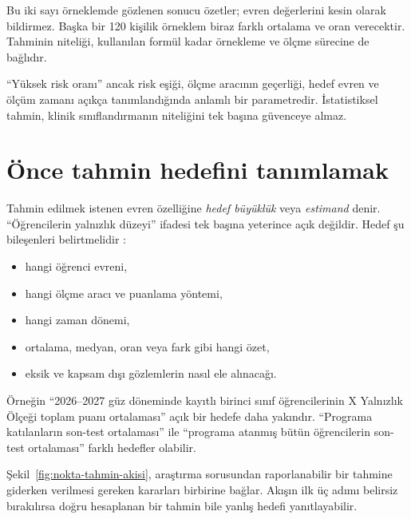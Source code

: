 Bu iki sayı örneklemde gözlenen sonucu özetler; evren değerlerini kesin olarak
bildirmez. Başka bir 120 kişilik örneklem biraz farklı ortalama ve oran
verecektir. Tahminin niteliği, kullanılan formül kadar örnekleme ve ölçme
sürecine de bağlıdır.

\begin{researchbox}
``Yüksek risk oranı'' ancak risk eşiği, ölçme aracının geçerliği, hedef evren
ve ölçüm zamanı açıkça tanımlandığında anlamlı bir parametredir. İstatistiksel
tahmin, klinik sınıflandırmanın niteliğini tek başına güvenceye almaz.
\end{researchbox}

\section{Önce tahmin hedefini tanımlamak}

Tahmin edilmek istenen evren özelliğine \emph{hedef büyüklük} veya
\emph{estimand} denir. ``Öğrencilerin yalnızlık düzeyi'' ifadesi tek başına
yeterince açık değildir. Hedef şu bileşenleri belirtmelidir
\cite{casella2002,hogg2019}:

\begin{itemize}
  \item hangi öğrenci evreni,
  \item hangi ölçme aracı ve puanlama yöntemi,
  \item hangi zaman dönemi,
  \item ortalama, medyan, oran veya fark gibi hangi özet,
  \item eksik ve kapsam dışı gözlemlerin nasıl ele alınacağı.
\end{itemize}

Örneğin ``2026--2027 güz döneminde kayıtlı birinci sınıf öğrencilerinin X
Yalnızlık Ölçeği toplam puanı ortalaması'' açık bir hedefe daha yakındır.
``Programa katılanların son-test ortalaması'' ile ``programa atanmış bütün
öğrencilerin son-test ortalaması'' farklı hedefler olabilir.

Şekil~\ref{fig:nokta-tahmin-akisi}, araştırma sorusundan raporlanabilir bir
tahmine giderken verilmesi gereken kararları birbirine bağlar. Akışın ilk üç
adımı belirsiz bırakılırsa doğru hesaplanan bir tahmin bile yanlış hedefi
yanıtlayabilir.

